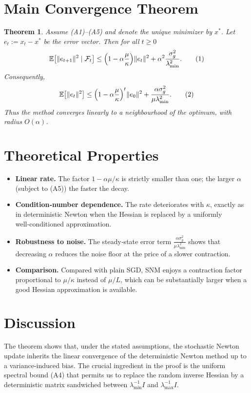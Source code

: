\documentclass[11pt]{article}
\newtheorem{theorem}{Theorem}
\newcommand{\E}{\mathbb{E}}
\begin{document}
\section*{Main Convergence Theorem}
\begin{theorem}
Assume (A1)–(A5) and denote the unique minimizer by $x^{*}$.  Let
$e_{t}:=x_{t}-x^{*}$ be the error vector.  Then for all $t\ge0$
\[
\E\bigl[\|e_{t+1}\|^{2}\mid\mathcal{F}_{t}\bigr]
\le\Bigl(1-\alpha\frac{\mu}{\kappa}\Bigr)\|e_{t}\|^{2}
+\alpha^{2}\frac{\sigma_{g}^{2}}{\lambda_{\min}^{2}} .
\tag{1}
\]
Consequently,
\[
\E\bigl[\|e_{t}\|^{2}\bigr]\le
\Bigl(1-\alpha\frac{\mu}{\kappa}\Bigr)^{t}\|e_{0}\|^{2}
+\frac{\alpha\sigma_{g}^{2}}{\mu\lambda_{\min}^{2}} .
\tag{2}
\]
Thus the method converges linearly to a neighbourhood of the optimum,
with radius $O(\alpha)$.
\end{theorem}

\section*{Theoretical Properties}
\begin{itemize}
\item \textbf{Linear rate.} The factor $1-\alpha\mu/\kappa$ is strictly smaller
than one; the larger $\alpha$ (subject to (A5)) the faster the decay.
\item \textbf{Condition‑number dependence.} The rate deteriorates with $\kappa$,
exactly as in deterministic Newton when the Hessian is replaced by a
uniformly well‑conditioned approximation.
\item \textbf{Robustness to noise.} The steady‑state error term
$\frac{\alpha\sigma_{g}^{2}}{\mu\lambda_{\min}^{2}}$ shows that decreasing
$\alpha$ reduces the noise floor at the price of a slower contraction.
\item \textbf{Comparison.} Compared with plain SGD,
SNM enjoys a contraction factor proportional to $\mu/\kappa$ instead of
$\mu/L$, which can be substantially larger when a good Hessian
approximation is available.
\end{itemize}

\section*{Discussion}
The theorem shows that, under the stated assumptions, the stochastic
Newton update inherits the linear convergence of the deterministic Newton
method up to a variance‑induced bias.  The crucial ingredient in the proof
is the uniform spectral bound (A4) that permits us to replace the random
inverse Hessian by a deterministic matrix sandwiched between
$\lambda_{\min}^{-1}I$ and $\lambda_{\max}^{-1}I$.
\end{document}
